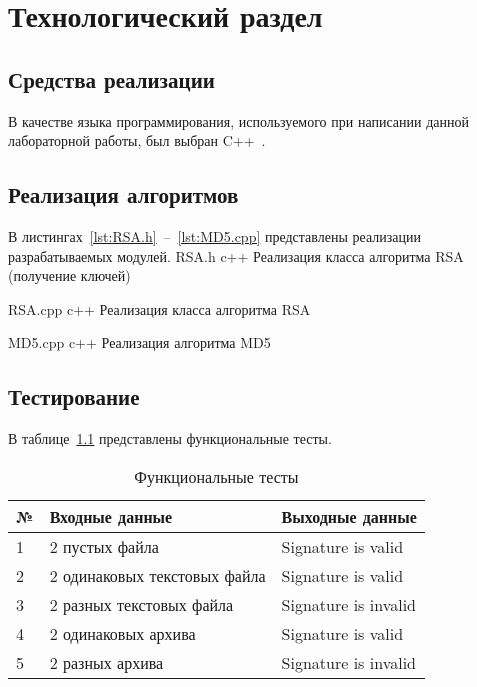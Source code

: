 \chapter{Технологический раздел}

\section{Средства реализации}

В качестве языка программирования, используемого при написании данной лабораторной работы, был выбран C++~\cite{cpp-lang}.

\section{Реализация алгоритмов}

В листингах~\ref{lst:RSA.h}~--~\ref{lst:MD5.cpp} представлены реализации разрабатываемых модулей.
	{RSA.h}
	{c++}
	{Реализация класса алгоритма RSA (получение ключей)}
	
	{RSA.cpp}
	{c++}
	{Реализация класса алгоритма RSA}

	{MD5.cpp}
	{c++}
	{Реализация алгоритма MD5}

\clearpage

\section{Тестирование}
В таблице~\ref{tbl:functional_test} представлены функциональные тесты.
\begin{table}[ht!]
	\begin{center}
		\captionsetup{justification=raggedright,singlelinecheck=off}
		\caption{\label{tbl:functional_test} Функциональные тесты}
		\begin{tabular}{|m{1em}|m{15em}|m{15em}|}
			\hline
			№ & Входные данные & Выходные данные \\ 
			\hline
			1 & 2 пустых файла & Signature is valid \\
			\hline
			2 & 2 одинаковых текстовых файла & Signature is valid \\
			\hline
			3 & 2 разных текстовых файла & Signature is invalid \\
			\hline
			4 & 2 одинаковых архива & Signature is valid \\
			\hline
			5 & 2 разных архива & Signature is invalid \\
			\hline
		\end{tabular}
	\end{center}
\end{table}